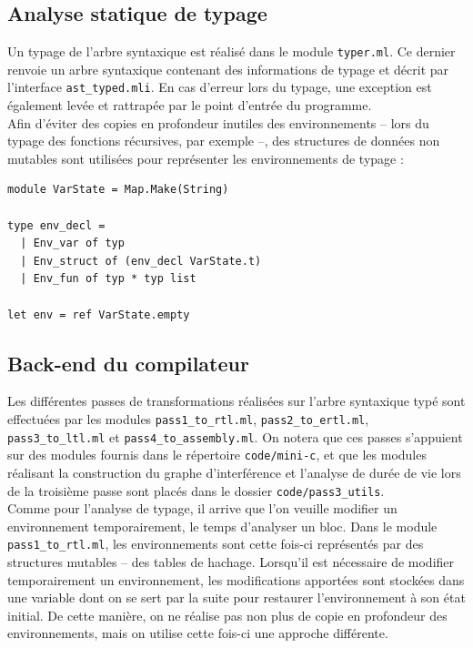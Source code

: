 \documentclass[paper=a4, fontsize=11pt]{scrartcl}
\numberwithin{figure}{section}			%
\numberwithin{table}{section}				%
\begin{document}
\subsection{Analyse statique de typage}

Un typage de l'arbre syntaxique est réalisé dans le module \texttt{typer.ml}. Ce dernier renvoie un arbre syntaxique contenant des informations de typage et décrit par l'interface \texttt{ast\_typed.mli}. En cas d'erreur lors du typage, une exception est également levée et rattrapée par le point d'entrée du programme.\\

Afin d'éviter des copies en profondeur inutiles des environnements -- lors du typage des fonctions récursives, par exemple --, des structures de données non mutables sont utilisées pour représenter les environnements de typage :

\begin{verbatim}
module VarState = Map.Make(String)

type env_decl =
  | Env_var of typ
  | Env_struct of (env_decl VarState.t)
  | Env_fun of typ * typ list

let env = ref VarState.empty
\end{verbatim}

\subsection{Back-end du compilateur}

Les différentes passes de transformations réalisées sur l'arbre syntaxique typé sont effectuées par les modules \texttt{pass1\_to\_rtl.ml}, \texttt{pass2\_to\_ertl.ml}, \texttt{pass3\_to\_ltl.ml} et \texttt{pass4\_to\_assembly.ml}. On notera que ces passes s'appuient sur des modules fournis dans le répertoire \texttt{code/mini-c}, et que les modules réalisant la construction du graphe d'interférence et l'analyse de durée de vie lors de la troisième passe sont placés dans le dossier \texttt{code/pass3\_utils}.\\

Comme pour l'analyse de typage, il arrive que l'on veuille modifier un environnement temporairement, le temps d'analyser un bloc. Dans le module \texttt{pass1\_to\_rtl.ml}, les environnements sont cette fois-ci représentés par des structures mutables -- des tables de hachage. Lorsqu'il est nécessaire de modifier temporairement un environnement, les modifications apportées sont stockées dans une variable dont on se sert par la suite pour restaurer l'environnement à son état initial. De cette manière, on ne réalise pas non plus de copie en profondeur des environnements, mais on utilise cette fois-ci une approche différente.
\end{document}
